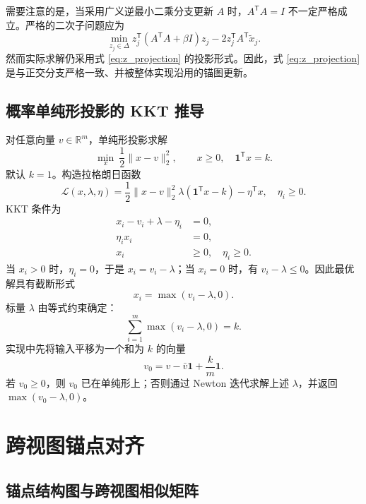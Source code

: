 \documentclass[UTF8,a4paper,12pt,fontset=none]{ctexart}
\newcommand{\R}{\mathbb{R}}
\newcommand{\one}{\mathbf{1}}
\newcommand{\T}{\mathsf{T}}
\begin{document}
需要注意的是，当采用广义逆最小二乘分支更新 \(A\) 时，\(A^\T A=I\) 不一定严格成立。严格的二次子问题应为
\begin{equation}
\min_{z_j\in\Delta}
z_j^\T(A^\T A+\beta I)z_j
-2z_j^\T A^\T\widetilde x_j .
\end{equation}
然而实际求解仍采用式 \eqref{eq:z_projection} 的投影形式。因此，式 \eqref{eq:z_projection} 是与正交分支严格一致、并被整体实现沿用的锚图更新。

\subsection{概率单纯形投影的 KKT 推导}

对任意向量 \(v\in\R^m\)，单纯形投影求解
\begin{equation}
\min_x\ \frac{1}{2}\|x-v\|_2^2,
\qquad
x\ge0,\quad \one^\T x=k .
\label{eq:simplex_problem}
\end{equation}
默认 \(k=1\)。构造拉格朗日函数
\begin{equation}
\mathcal{L}(x,\lambda,\eta)
=
\frac{1}{2}\|x-v\|_2^2
\lambda(\one^\T x-k)-\eta^\T x,
\quad \eta_i\ge0.
\end{equation}
KKT 条件为
\begin{align}
x_i-v_i+\lambda-\eta_i&=0,\\
\eta_i x_i&=0,\\
x_i&\ge0,\quad \eta_i\ge0.
\end{align}
当 \(x_i>0\) 时，\(\eta_i=0\)，于是 \(x_i=v_i-\lambda\)；当 \(x_i=0\) 时，有 \(v_i-\lambda\le0\)。因此最优解具有截断形式
\begin{equation}
x_i=\max(v_i-\lambda,0).
\end{equation}
标量 \(\lambda\) 由等式约束确定：
\begin{equation}
\sum_{i=1}^{m}\max(v_i-\lambda,0)=k .
\end{equation}
实现中先将输入平移为一个和为 \(k\) 的向量
\begin{equation}
v_0=v-\bar v\one+\frac{k}{m}\one .
\end{equation}
若 \(v_0\ge0\)，则 \(v_0\) 已在单纯形上；否则通过 Newton 迭代求解上述 \(\lambda\)，并返回 \(\max(v_0-\lambda,0)\)。

\section{跨视图锚点对齐}

\subsection{锚点结构图与跨视图相似矩阵}
\end{document}
